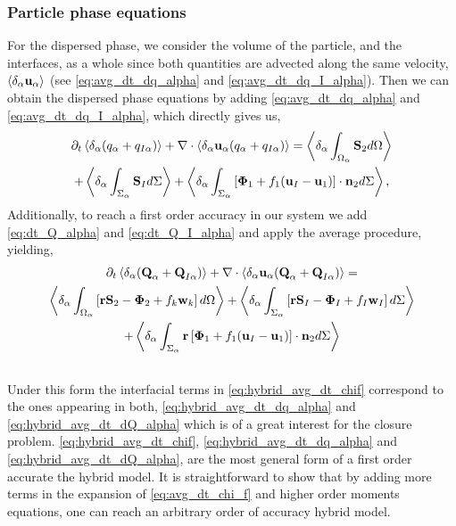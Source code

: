 \subsubsection*{Particle phase equations}
For the dispersed phase, we consider the volume of the particle, and the interfaces, as a whole since both quantities are advected along the same velocity, $\left<\delta_\alpha \textbf{u}_\alpha\right>$ (see \ref{eq:avg_dt_dq_alpha} and \ref{eq:avg_dt_dq_I_alpha}).
Then we can obtain the dispersed phase equations by adding \ref{eq:avg_dt_dq_alpha} and \ref{eq:avg_dt_dq_I_alpha}, which directly gives us, 
\begin{multline}
    \partial_t \left<\delta_\alpha (q_\alpha+q_{I\alpha})\right>
    + \mathbf{\nabla} \cdot\left<\delta_\alpha \textbf{u}_\alpha (q_\alpha+q_{I\alpha})\right>
    = \left<\delta_\alpha \int_{\Omega_\alpha} \textbf{S}_2 d\Omega\right>\\
    + \left<\delta_\alpha \int_{\Sigma_\alpha} \textbf{S}_I d\Sigma\right>
    + \left<\delta_\alpha \int_{\Sigma_\alpha} \left[\mathbf{\Phi}_1 + f_1 (\textbf{u}_I-\textbf{u}_1) \right] \cdot \textbf{n}_2 d\Sigma\right>,
    \label{eq:hybrid_avg_dt_dq_alpha}\\
\end{multline}
Additionally, to reach a first order accuracy in our system we add \ref{eq:dt_Q_alpha} and \ref{eq:dt_Q_I_alpha} and apply the average procedure, yielding,
\begin{multline}
    \partial_t \left<\delta_\alpha (\textbf{Q}_\alpha+\textbf{Q}_{I\alpha})\right>
    + \mathbf{\nabla}\cdot \left<\delta_\alpha   \textbf{u}_\alpha (\textbf{Q}_\alpha+ \textbf{Q}_{I\alpha})\right>
    =\\ \left<\delta_\alpha \int_{\Omega_\alpha} \left[
        \textbf{r}\textbf{S}_2
        - \mathbf{\Phi}_2
        + f_k\textbf{w}_k
        \right] d\Omega\right>
    + \left<\delta_\alpha \int_{\Sigma_\alpha} \left[
        \textbf{r}\textbf{S}_I
        - \mathbf{\Phi}_I
        + f_I\textbf{w}_I
    \right] d\Sigma\right>\\
    + \left<\delta_\alpha \int_{\Sigma_\alpha} \textbf{r}\left[\mathbf{\Phi}_1 + f_1 (\textbf{u}_I-\textbf{u}_1) \right] \cdot \textbf{n}_2 d\Sigma\right>\\
    \label{eq:hybrid_avg_dt_dQ_alpha}\\
\end{multline}
Under this form the interfacial terms in \ref{eq:hybrid_avg_dt_chif} correspond to the ones appearing in both, \ref{eq:hybrid_avg_dt_dq_alpha} and \ref{eq:hybrid_avg_dt_dQ_alpha} which is of a great interest for the closure problem.
\ref{eq:hybrid_avg_dt_chif}, \ref{eq:hybrid_avg_dt_dq_alpha} and \ref{eq:hybrid_avg_dt_dQ_alpha}, are the most general form of a first order accurate the hybrid model. 
It is straightforward to show that by adding more terms in the expansion of \ref{eq:avg_dt_chi_f} and higher order moments equations, one can reach an arbitrary order of accuracy hybrid model. 


